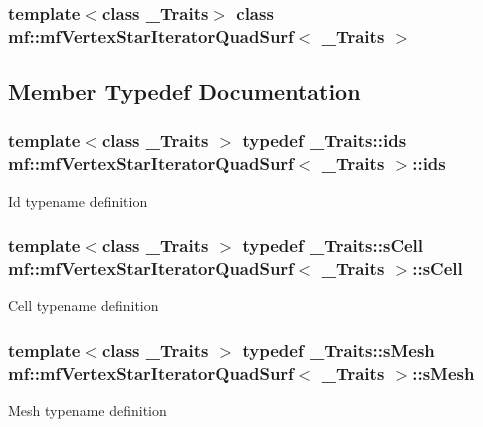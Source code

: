 \subsubsection*{template$<$class \_\-Traits$>$ class mf::mfVertexStarIteratorQuadSurf$<$ \_\-Traits $>$}



\subsection{Member Typedef Documentation}
\hypertarget{classmf_1_1mfVertexStarIteratorQuadSurf_a5c6de4cc45f4f21c3e30a4753fc9b22b}{
\subsubsection[{ids}]{\setlength{\rightskip}{0pt plus 5cm}template$<$class \_\-Traits $>$ typedef \_\-Traits::ids {\bf mf::mfVertexStarIteratorQuadSurf}$<$ \_\-Traits $>$::{\bf ids}}}
\label{classmf_1_1mfVertexStarIteratorQuadSurf_a5c6de4cc45f4f21c3e30a4753fc9b22b}
Id typename definition \hypertarget{classmf_1_1mfVertexStarIteratorQuadSurf_ae12c1c72db3d7cfc1240928080fa58f0}{
\subsubsection[{sCell}]{\setlength{\rightskip}{0pt plus 5cm}template$<$class \_\-Traits $>$ typedef \_\-Traits::sCell {\bf mf::mfVertexStarIteratorQuadSurf}$<$ \_\-Traits $>$::{\bf sCell}}}
\label{classmf_1_1mfVertexStarIteratorQuadSurf_ae12c1c72db3d7cfc1240928080fa58f0}
Cell typename definition \hypertarget{classmf_1_1mfVertexStarIteratorQuadSurf_aad751ed48afa8c48bba2ed997bdd4676}{
\subsubsection[{sMesh}]{\setlength{\rightskip}{0pt plus 5cm}template$<$class \_\-Traits $>$ typedef \_\-Traits::sMesh {\bf mf::mfVertexStarIteratorQuadSurf}$<$ \_\-Traits $>$::{\bf sMesh}}}
\label{classmf_1_1mfVertexStarIteratorQuadSurf_aad751ed48afa8c48bba2ed997bdd4676}
Mesh typename definition 

